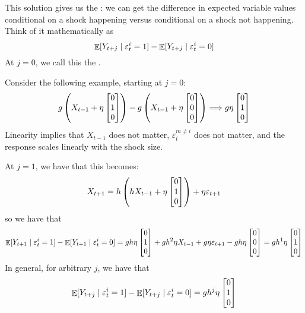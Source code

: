 \documentclass[10pt]{article}
\begin{document}
\begin{definition}
	This solution gives us the : we can get the difference in expected variable values conditional on a shock happening versus conditional on a shock not happening. Think of it mathematically as
	\[
	\mathop{\mathbb{E}}[Y_{t+j} \mid \varepsilon_t^i = 1] - \mathop{\mathbb{E}}[Y_{t+j} \mid \varepsilon_t^i = 0]
	\]
	At $j = 0$, we call this the .
	\end{definition}
	
	\begin{example}
	Consider the following example, starting at $j = 0$:
	\[
		g\left( X_{t-1} + \eta \begin{bmatrix}0 \\ 1 \\ 0\end{bmatrix}\right) - g\left( X_{t-1} + \eta \begin{bmatrix}0\\0\\0\end{bmatrix}\right) \Longrightarrow g \eta \begin{bmatrix}0 \\ 1 \\ 0\end{bmatrix}
	\]
	Linearity implies that $X_{t-1}$ does not matter, $\varepsilon_t^{m \ne i}$ does not matter, and the response scales linearly with the shock size.
	
	At $j = 1$, we have that this becomes:
	\[
	X_{t+1} = h\left( hX_{t-1} + \eta \begin{bmatrix}0 \\ 1 \\ 0\end{bmatrix}\right) + \eta \varepsilon_{t+1}
	\]
	so we have that
	\[
	\mathop{\mathbb{E}}[Y_{t+1} \mid \varepsilon_t^i = 1] - \mathop{\mathbb{E}}[Y_{t+1} \mid \varepsilon_t^i = 0] = gh\eta \begin{bmatrix}0 \\ 1 \\ 0\end{bmatrix} + gh^2 \eta X_{t-1} + g\eta \varepsilon_{t+1} - gh\eta \begin{bmatrix}0 \\ 0 \\ 0\end{bmatrix} = gh^1 \eta \begin{bmatrix}0 \\ 1 \\ 0\end{bmatrix}
 	\]
 	In general, for arbitrary $j$, we have that 
 	\[
 	\mathop{\mathbb{E}}[Y_{t+j} \mid \varepsilon_t^i = 1] - \mathop{\mathbb{E}}[Y_{t+j} \mid \varepsilon_t^i = 0] = gh^j \eta \begin{bmatrix}0 \\ 1 \\ 0\end{bmatrix}
 	\]
	\end{example}
	
\end{document}
